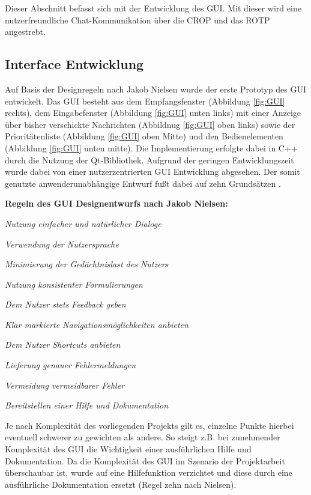 \label{cap:chatGui}

Dieser Abschnitt befasst sich mit der Entwicklung des \gls{GUI}. Mit dieser
wird eine nutzerfreundliche Chat-Kommunikation über die \gls{CROP}
und das \gls{ROTP} angestrebt.

\subsection{Interface Entwicklung}
Auf Basis der Designregeln nach Jakob Nielsen wurde der
erste Prototyp des GUI entwickelt.
\newline Das GUI besteht aus dem Empfangsfenster (Abbildung
\ref{fig:GUI} rechts), dem Eingabefenster (Abbildung \ref{fig:GUI}
unten links) mit einer Anzeige über bisher verschickte Nachrichten
(Abbildnug \ref{fig:GUI} oben links) sowie der Priorit{\"a}tenliste
(Abbildung \ref{fig:GUI} oben Mitte) und den Bedienelementen (Abbildung
\ref{fig:GUI} unten mitte). Die Implementierung erfolgte dabei in C++
durch die Nutzung der Qt-Bibliothek. Aufgrund der geringen Entwicklungszeit
wurde dabei von einer nutzerzentrierten \gls{GUI} Entwicklung abgesehen. Der
somit genutzte anwenderunabh{\"a}ngige Entwurf fu{\ss}t dabei auf zehn
Grunds{\"a}tzen \cite{Nielsen}.

\textbf{Regeln des \gls{GUI} Designentwurfs nach Jakob Nielsen:}

   \begin{compactenum}[I]
     \item \textit{Nutzung einfacher und nat{\"u}rlicher Dialoge}
     \item \textit{Verwendung der Nutzersprache}
     \item \textit{Minimierung der Ged{\"a}chtnislast des Nutzers}
     \item \textit{Nutzung konsistenter Formulierungen}
     \item \textit{Dem Nutzer stets Feedback geben}
     \item \textit{Klar markierte Navigationsm{\"o}glichkeiten anbieten}
     \item \textit{Dem Nutzer Shortcuts anbieten}
     \item \textit{Lieferung genauer Fehlermeldungen}
     \item \textit{Vermeidung vermeidbarer Fehler}
     \item \textit{Bereitstellen einer Hilfe und Dokumentation}
   \end{compactenum}
   \label{Nielsen}

Je nach Komplexit{\"a}t des vorliegenden Projekts gilt es, einzelne Punkte
hierbei eventuell schwerer zu gewichten als andere. So steigt z.B. bei
zunehmender Komplexit{\"a}t des \gls{GUI} die Wichtigkeit einer ausf{\"u}hrlichen
Hilfe und Dokumentation. Da die Komplexit{\"a}t des \gls{GUI} im Szenario der
Projektarbeit {\"u}berschaubar ist, wurde auf eine Hilfefunktion verzichtet
und diese durch eine ausf{\"u}hrliche Dokumentation ersetzt (Regel zehn nach
Nielsen).

